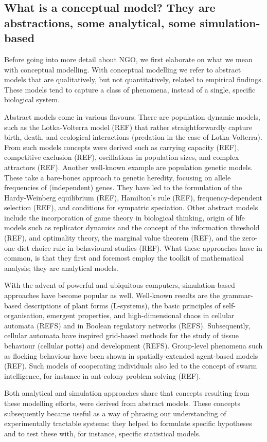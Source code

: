 \subsection{What is a conceptual model? They are abstractions, some analytical, some simulation-based}

Before going into more detail about NGO, we first elaborate on what we mean with conceptual modelling. With conceptual modelling we refer to abstract models that are qualitatively, but not quantitatively, related to empirical findings. These models tend to capture a class of phenomena, instead of a single, specific biological system.

Abstract models come in various flavours. There are population dynamic models, such as the Lotka-Volterra model (REF) that rather straightforwardly capture birth, death, and ecological interactions (predation in the case of Lotka-Volterra). From such models concepts were derived such as carrying capacity (REF), competitive exclusion (REF), oscillations in population sizes, and complex attractors (REF). Another well-known example are population genetic models. These take a bare-bones approach to genetic heredity, focusing on allele frequencies of (independent) genes. They have led to the formulation of the Hardy-Weinberg equilibrium (REF), Hamilton’s rule (REF), frequency-dependent selection (REF), and conditions for sympatric speciation. Other abstract models include the incorporation of game theory in biological thinking, origin of life models such as replicator dynamics and the concept of the information threshold (REF), and optimality theory, the marginal value theorem (REF), and the zero-one diet choice rule in behavioural studies (REF). What these approaches have in common, is that they first and foremost employ the toolkit of mathematical analysis; they are analytical models.

With the advent of powerful and ubiquitous computers, simulation-based approaches have become popular as well. Well-known results are the grammar-based descriptions of plant forms (L-systems), the basic principles of self-organisation, emergent properties, and high-dimensional chaos in cellular automata (REFS) and in Boolean regulatory networks (REFS). Subsequently, cellular automata have inspired grid-based methods for the study of tissue behaviour (cellular potts) and development (REFS). Group-level phenomena such as flocking behaviour have been shown in spatially-extended agent-based models (REF). Such models of cooperating individuals also led to the concept of swarm intelligence, for instance in ant-colony problem solving (REF).

Both analytical and simulation approaches share that concepts resulting from these modelling efforts, were derived from abstract models. These concepts subsequently became useful as a way of phrasing our understanding of experimentally tractable systems: they helped to formulate specific hypotheses and to test these with, for instance, specific statistical models.
  
